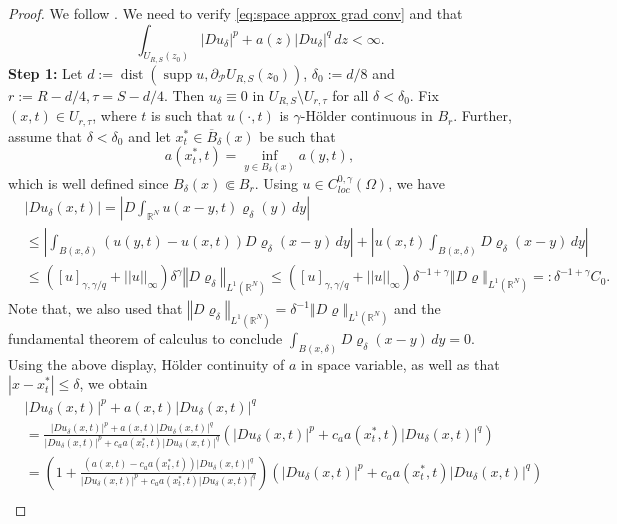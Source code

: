 \documentclass[10pt,a4paper]{amsart}
\numberwithin{equation}{section}
\newcommand{\RR}{\mathds{R}}
\DeclareMathOperator*{\supp}{supp}
\begin{document}
\begin{proof} We follow \cite[Theorem 3.2]{SS25}. We need to verify \eqref{eq:space approx grad conv} and that
\[\int_{U_{R, S}(z_0)}|Du_{\delta}|^p+a(z)|Du_{\delta}|^q\, dz< \infty.\]
\textbf{Step 1:} Let $d:=\operatorname{dist}(\supp u,\partial_{\mathcal{P}} U_{R, S}(z_0))$, $\delta_{0}:=d/8$
and $r:=R-d/4, \tau=S-d/4$. Then $u_{\delta}\equiv0$ in $U_{R, S}\setminus U_{r, \tau}$
for all $\delta<\delta_{0}$. Fix $(x,t)\in U_{r, \tau}$, where $t$ is such that $u(\cdot, t)$ is $\gamma$-H\"{o}lder continuous in $B_r.$ Further, assume that $\delta<\delta_{0}$ and let $x_{t}^{\ast}\in\overline{B}_{\delta}(x)$
be such that 
\[
a(x_{t}^{\ast},t)=\inf_{y\in B_{\delta}(x)}a(y,t),
\]
which is well defined since $B_{\delta}(x)\Subset B_{r}.$ Using $u \in C^{0, \gamma}_{loc}(\Omega)$, we have
\begin{align*}
&\left|Du_{\delta}(x,t)\right|=\left|D\int_{\RR^{N}}u\left(x-y,t\right)\varrho_{\delta}(y)\, dy\right|\\
& \leq \left|\int_{B(x, \delta)}\left(u(y,t)-u(x,t)\right)D\varrho_{\delta}(x-y)\,dy\right|+\left|u(x, t)\int_{B(x, \delta)}D\varrho_{\delta}(x-y)\, dy\right|\\
 & \leq([u]_{\gamma, \gamma/q}+||u||_{\infty})\delta^{\gamma}\left\Vert D\varrho_{\delta}\right\Vert _{L^{1}(\RR^{N})}\leq([u]_{\gamma, \gamma/q}+||u||_{\infty})\delta^{-1+\gamma}\left\Vert D\varrho\right\Vert _{L^{1}(\RR^{N})}=:\delta^{-1+\gamma}C_{0}.
\end{align*}
Note that,  we also used that $\left\Vert D\varrho_{\delta}\right\Vert _{L^{1}(\RR^{N})}=\delta^{-1}\left\Vert D\varrho\right\Vert _{L^{1}(\RR^{N})}$ and the fundamental theorem of calculus to conclude $\int_{B(x, \delta)}D\varrho_{\delta}(x-y)\, dy=0.$
Using the above display, H\"{o}lder continuity of $a$ in space variable,
as well as that $\left|x-x_{t}^{\ast}\right|\leq\delta$, we obtain
\begin{align*}
 & \left|Du_{\delta}(x,t)\right|^{p}+a(x,t)\left|Du_{\delta}(x,t)\right|^{q}\nonumber \\
 & =\frac{\left|Du_{\delta}(x,t)\right|^{p}+a(x,t)\left|Du_{\delta}(x,t)\right|^{q}}{\left|Du_{\delta}(x,t)\right|^{p}+c_a a(x_{t}^{\ast},t)\left|Du_{\delta}(x,t)\right|^{q}}\left(\left|Du_{\delta}(x,t)\right|^{p}+c_a a(x^{\ast}_t,t)\left|Du_{\delta}(x,t)\right|^{q}\right)\nonumber \\
 & =\left(1+\frac{(a(x,t)-c_ a a(x_{t}^{\ast},t))\left|Du_{\delta}(x,t)\right|^{q}}{\left|Du_{\delta}(x,t)\right|^{p}+c_a a(x_{t}^{\ast},t)\left|Du_{\delta}(x,t)\right|^{q}}\right)\left(\left|Du_{\delta}(x,t)\right|^{p}+c_a a(x^{\ast}_t,t)\left|Du_{\delta}(x,t)\right|^{q}\right)\nonumber \\

\end{align*}
\end{proof}
\end{document}
